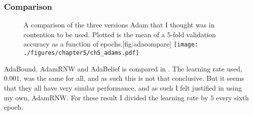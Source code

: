\subsubsection{Comparison}
\begin{figure}[h]
	\begin{sidecaption}[Adams.]{A comparison of the three versions \ac{Adam} that I thought was in contention to be used. Plotted is the mean of a 5-fold validation accuracy as a function of epochs.}[fig:adacompare]
		\centering
		\texttt{[image: ./figures/chapter5/ch5\_adams.pdf]}
	\end{sidecaption}
\end{figure}
AdaBound, AdamRNW and AdaBelief is compared in .
The learning rate used, $0.001$, was the same for all, and as such this is not that conclusive. But it seems that they all have very similar performance, and as such I felt justified in using my own, AdamRNW.
For these result I divided the learning rate by $5$ every sixth epoch. 